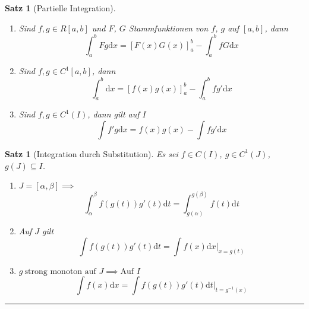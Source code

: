 \documentclass[a4paper]{article}
\newcounter{Sec}
\theoremstyle{marginbreak}
\newtheorem{satz}[definition]{Satz}
\newcommand{\sep}{%
	\rule{\textwidth}{0.3pt}%
	\stepcounter{Sec}%
	}
\renewcommand{\d}[1]{\mathrm{d}#1}
\begin{document}
	\begin{satz}[Partielle Integration]
		\begin{enumerate}[label=(\alph*)]
			\item Sind $f,g\in R[a,b]$ und $F$, $G$ Stammfunktionen von $f$, $g$
				auf $[a,b]$, dann
				\[ \int_a^bFg\d{x}=[F(x)G(x)]_a^b-\int_a^bfG\d{x} \]
			\item Sind $f,g\in C^1[a,b]$, dann
				\[ \int_a^b\d{x}=[f(x)g(x)]_a^b-\int_a^bfg'\d{x} \]
			\item Sind $f,g\in C^1(I)$, dann gilt auf $I$
				\[ \int f'g\d{x}=f(x)g(x)-\int fg'\d{x} \]
		\end{enumerate}
	\end{satz}
	\begin{satz}[Integration durch Substitution]
		Es sei $f\in C(I)$, $g\in C^1(J)$, $g(J)\subseteq I$.
		\begin{enumerate}[label=(\alph*)]
			\item $J = [\alpha,\beta]\implies$
				\[ \int_\alpha^\beta f(g(t))g'(t)\d{t}=\int_{g(\alpha)}^{g(\beta)}f(t)\d{t} \]
			\item Auf $J$ gilt
				\[ \int f(g(t))g'(t)\d{t}=\int f(x)\d{x}|_{x=g(t)} \]
			\item $g~\text{strong monoton auf $J$}\implies\text{Auf $I$}$
				\[ \int f(x)\d{x}=\int f(g(t))g'(t)\d{t}|_{t=g^{-1}(x)} \]
		\end{enumerate}
	\end{satz}
	\newpage
	\sep
\end{document}
